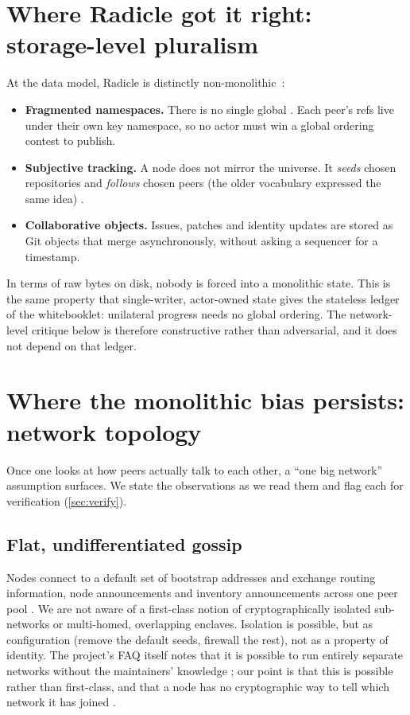 \documentclass[a4paper,11pt,twoside,parskip=half-,headings=small]{scrartcl}
\begin{document}
\section{Where Radicle got it right: storage-level pluralism}
\label{sec:right}

At the data model, Radicle is distinctly non-monolithic~\cite{radicle2024}:
\begin{itemize}
  \item \textbf{Fragmented namespaces.} There is no single global . Each peer's
        refs live under their own key namespace, so no actor must win a global ordering
        contest to publish.
  \item \textbf{Subjective tracking.} A node does not mirror the universe. It
        \emph{seeds} chosen repositories and \emph{follows} chosen peers
        (the older  vocabulary expressed the same idea) .
  \item \textbf{Collaborative objects.} Issues, patches and identity updates are stored as
        Git objects that merge asynchronously, without asking a sequencer for a timestamp.
\end{itemize}
In terms of raw bytes on disk, nobody is forced into a monolithic state. This is the same
property that single-writer, actor-owned state gives the stateless ledger of the whitebooklet:
unilateral progress needs no global ordering. The network-level critique below is therefore
constructive rather than adversarial, and it does not depend on that ledger.

\section{Where the monolithic bias persists: network topology}
\label{sec:bias}

Once one looks at how peers actually talk to each other, a ``one big network''
assumption surfaces. We state the observations as we read them and flag each for
verification (\cref{sec:verify}).

\subsection{Flat, undifferentiated gossip}
Nodes connect to a default set of bootstrap addresses and exchange routing information,
node announcements and inventory announcements across one peer pool .
We are not aware of a first-class notion of cryptographically isolated sub-networks or
multi-homed, overlapping enclaves. Isolation is possible, but as configuration (remove the
default seeds, firewall the rest), not as a property of identity. The project's FAQ itself notes that it is possible to run entirely separate networks without the maintainers' knowledge ; our point is that this is possible rather than first-class, and that a node has no cryptographic way to tell which network it has joined .
\end{document}
